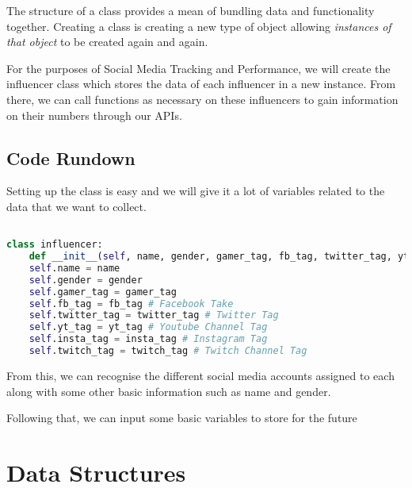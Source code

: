 \documentclass[12pt, letterpaper]{article}
\begin{document}
The structure of a class provides a mean of bundling data and functionality together. Creating a class is creating a new type of object allowing \textit{instances of that object} to be created again and again.

For the purposes of Social Media Tracking and Performance, we will create the influencer class which stores the data of each influencer in a new instance. From there, we can call functions as necessary on these influencers to gain information on their numbers through our APIs.

\subsection{Code Rundown}
Setting up the class is easy and we will give it a lot of variables related to the data that we want to collect.

\begin{lstlisting}[language=python]

class influencer:
	def __init__(self, name, gender, gamer_tag, fb_tag, twitter_tag, yt_tag, insta_tag, twitch_tag)
	self.name = name
	self.gender = gender
	self.gamer_tag = gamer_tag
	self.fb_tag = fb_tag # Facebook Take
	self.twitter_tag = twitter_tag # Twitter Tag
	self.yt_tag = yt_tag # Youtube Channel Tag
	self.insta_tag = insta_tag # Instagram Tag
	self.twitch_tag = twitch_tag # Twitch Channel Tag

\end{lstlisting}

From this, we can recognise the different social media accounts assigned to each along with some other basic information such as name and gender.

Following that, we can input some basic variables to store for the future

\section{Data Structures}
\end{document}
